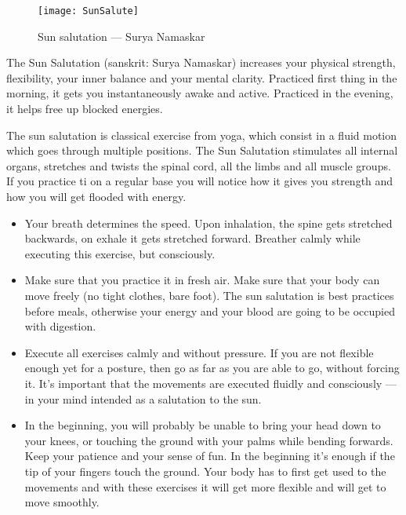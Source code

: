 \documentclass[../Book.Stress_regulation.tex]{subfiles}
\begin{document}
\label{Ex:SunSalutation}
\begin{figure}[htb!]
\texttt{[image: SunSalute]}\label{sf:yoga}
\caption{Sun salutation --- Surya Namaskar}
\end{figure}


The Sun Salutation (sanskrit: Surya Namaskar) increases your physical strength, flexibility, your inner balance and your mental clarity.
Practiced first thing in the morning, it gets you instantaneously awake and active.
Practiced in the evening, it helps free up blocked energies.

The sun salutation is classical exercise from yoga, which consist in a fluid motion which goes through multiple positions.
The Sun Salutation stimulates all internal organs, stretches and twists the spinal cord, all the limbs and all muscle groups.
If you practice ti on a regular base you will notice how it gives you strength and how you will get flooded with energy.

\begin{itemize}
\item Your breath determines the speed.
  Upon inhalation, the spine gets stretched backwards, on exhale it gets stretched forward.
  Breather calmly while executing this exercise, but consciously.
\item Make sure that you practice it in fresh air.
  Make sure that your body can move freely (no tight clothes, bare foot).
  The sun salutation is best practices before meals, otherwise your energy and your blood are going to be occupied with digestion.
\item Execute all exercises calmly and without pressure. If you are not flexible enough yet for a posture, then go as far as you are able to go, without forcing it.
  It's important that the movements are executed fluidly and consciously --- in your mind intended as a salutation to the sun.
\item In the beginning, you will probably be unable to bring your head down to your knees, or touching the ground with your palms while bending forwards.
  Keep your patience and your sense of fun. In the beginning it's enough if the tip of your fingers touch the ground.
  Your body has to first get used to the movements and with these exercises it will get more flexible and will get to move smoothly.
\end{itemize}
\end{document}
